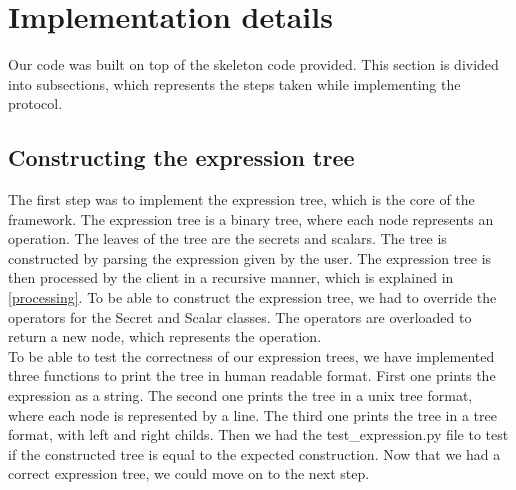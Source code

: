 \documentclass[10pt,conference,compsocconf]{IEEEtran}
\begin{document}
\section{Implementation details}
\label{impl_details}
Our code was built on top of the skeleton code provided. This section is divided into subsections, which represents the steps taken while implementing the
protocol.
\subsection{Constructing the expression tree}
\label{expression}
The first step was to implement the expression tree, which is the core of the framework. The expression tree is a binary tree, where each node represents
an operation. The leaves of the tree are the secrets and scalars. The tree is constructed by parsing the expression given by the user. The expression tree
is then processed by the client in a recursive manner, which is explained in \ref{processing}. To be able to construct the expression tree, we had to override
the operators for the Secret and Scalar classes. The operators are overloaded to return a new node, which represents the operation.
\\
To be able to test the correctness of our expression trees, we have implemented three functions to print the tree in human readable format. First one prints the expression
as a string. The second one prints the tree in a unix tree format, where each node is represented by a line. The third one prints the tree in a tree format, with left and right childs.
Then we had the test\_expression.py file to test if the constructed tree is equal to the expected construction. Now that we had a correct expression tree, we could move on to the next step.
\end{document}
